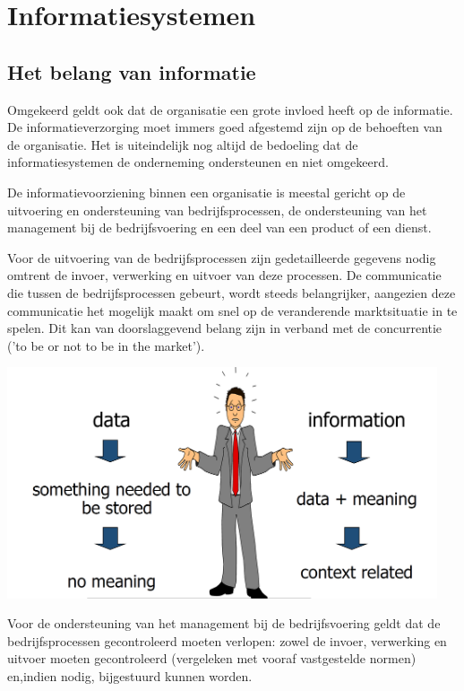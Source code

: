 \section{Informatiesystemen}

\subsection{Het belang van informatie}
Omgekeerd geldt ook dat de organisatie een grote invloed heeft op de informatie. De informatieverzorging moet immers goed afgestemd zijn op de behoeften van de organisatie. Het is uiteindelijk nog altijd de bedoeling dat de informatiesystemen de onderneming ondersteunen en niet omgekeerd.

De informatievoorziening binnen een organisatie is meestal gericht op de uitvoering en ondersteuning van bedrijfsprocessen, de ondersteuning van het management bij de bedrijfsvoering en een deel van een product of een dienst.

Voor de uitvoering van de bedrijfsprocessen zijn gedetailleerde gegevens nodig omtrent de invoer, verwerking en uitvoer van deze processen. De communicatie die tussen de bedrijfsprocessen gebeurt, wordt steeds belangrijker, aangezien deze communicatie het mogelijk maakt om snel op de veranderende marktsituatie in te spelen. Dit kan van doorslaggevend belang zijn in verband met de concurrentie ('to be or not to be in the market').

\begin{center}
\includegraphics[width=5in]{img/theimportanceofinformation}%
\end{center}

Voor de ondersteuning van het management bij de bedrijfsvoering geldt dat de bedrijfsprocessen gecontroleerd moeten verlopen: zowel de invoer, verwerking en uitvoer moeten gecontroleerd (vergeleken met vooraf vastgestelde normen) en,indien nodig, bijgestuurd kunnen worden.


